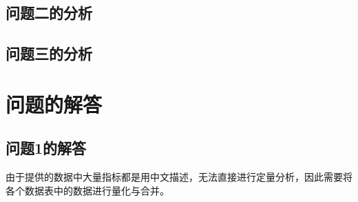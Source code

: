 \documentclass{cumcm}
\begin{document}
\subsection{问题二的分析}


\subsection{问题三的分析}




\section{问题的解答}
\subsection{问题1的解答}
由于提供的数据中大量指标都是用中文描述，无法直接进行定量分析，因此需要将各个数据表中的数据进行量化与合并。
\end{document}

